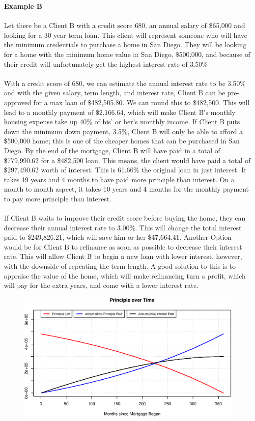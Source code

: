 \documentclass[12pt]{article}
\newenvironment{Section}[1]{}{\newpage}
\begin{document}
	\begin{Section}{Example B}
		\textbf{\Huge Example B}
		\\ \\
		Let there be a Client B with a credit score 680, an annual salary of \$65,000 and looking for a 30 year term loan.  This client will represent someone who will have the minimum credentials to purchase a home in San Diego.  They will be looking for a home with the minimum home value in San Diego, \$500,000, and because of their credit will unfortunately get the highest interest rate of 3.50\%
		\\  \\
		With a credit score of 680, we can estimate the annual interest rate to be 3.50\% and with the given salary, term length, and interest rate, Client B can be pre-approved for a max loan of \$482,505.80. We can round this to \$482,500.  This will lead to a monthly payment of \$2,166.64, which will make Client B's monthly housing expense take up 40\% of his' or her's monthly income.   If Client B puts down the minimum down payment, 3.5\%, Client B will only be able to afford a \$500,000 home; this is one of the cheaper homes that can be purchased in San Diego.  By the end of the mortgage, Client B will have paid in a total of \$779,990.62 for a \$482,500 loan.  This means, the client would have paid a total of \$297,490.62 worth of interest.  This is 61.66\% the original loan in just interest.  It takes 19 years and 4 months to have paid more principle than interest.  On a month to month aspect, it takes 10 years and 4 months for the monthly payment to pay more principle than interest. 
		\\ \\
		If Client B waits to improve their credit score before buying the home, they can decrease their annual interest rate to 3.00\%.  This will change the total interest paid to \$249,826.21, which will save him or her \$47,664.41.  Another Option would be for Client B to refinance as soon as possible to decrease their interest rate.  This will allow Client B to begin a new loan with lower interest, however, with the downside of repeating the term length.  A good solution to this is to appraise the value of the home, which will make refinancing turn a profit, which will pay for the extra years, and come with a lower interest rate.
		\\
		\begin{figure}[h!]
			\centering
			\includegraphics[width = \linewidth]{Figures/POT.C680.S65.T30}

\end{figure}
\end{Section}
\end{document}
